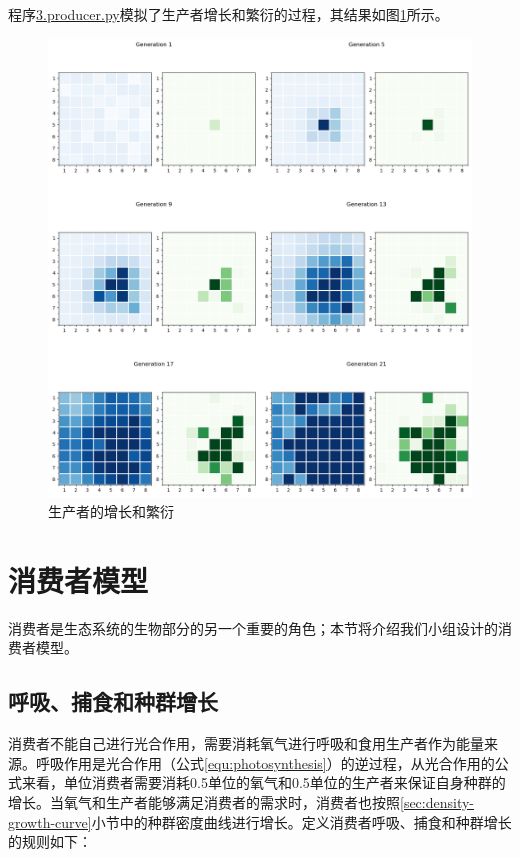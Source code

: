 \documentclass{ctexart}
\begin{document}
程序\underline{3.producer.py}模拟了生产者增长和繁衍的过程，其结果如图\ref{fig:producer-growth}所示。

\begin{figure}[ht]
  \centering
  \includegraphics[width=\textwidth]{producer-growth.png}
  \caption{生产者的增长和繁衍}
  \label{fig:producer-growth}
\end{figure}

\section{消费者模型}

消费者是生态系统的生物部分的另一个重要的角色；本节将介绍我们小组设计的消费者模型。

\subsection{呼吸、捕食和种群增长} \label{sec:consumer-growth-rule}

消费者不能自己进行光合作用，需要消耗氧气进行呼吸和食用生产者作为能量来源。呼吸作用是光合作用（公式\ref{equ:photosynthesis}）的逆过程，从光合作用的公式来看，单位消费者需要消耗0.5单位的氧气和0.5单位的生产者来保证自身种群的增长。当氧气和生产者能够满足消费者的需求时，消费者也按照\ref{sec:density-growth-curve}小节中的种群密度曲线进行增长。定义消费者呼吸、捕食和种群增长的规则如下：
\end{document}

